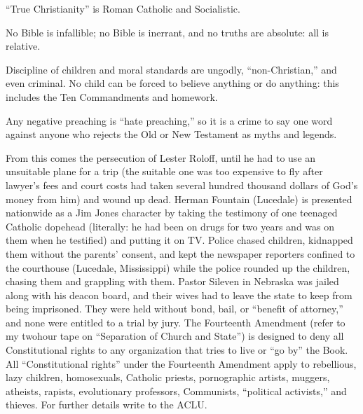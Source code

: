 {\begin{compactenum}
\item “True Christianity” is Roman Catholic and Socialistic.
\item No Bible is infallible; no Bible is inerrant, and no truths are absolute: all is relative.
\item Discipline of children and moral standards are ungodly, “non-Christian,” and even criminal. No child can be forced to believe anything or do anything: this includes the Ten Commandments and homework.
\item Any negative preaching is “hate preaching,” so it is a crime to say one word against anyone who rejects the Old or New Testament as myths and legends.
\end{compactenum}
From this comes the persecution of Lester Roloff, until he had to use an unsuitable plane for a trip (the suitable one was too expensive to fly after lawyer’s fees and court costs had taken several hundred thousand dollars of God’s money from him) and wound up dead. Herman Fountain (Lucedale) is presented nationwide as a Jim Jones character by taking the testimony of one teenaged Catholic dopehead (literally: he had been on drugs for two years and was on them when he testified) and putting it on TV. Police chased children, kidnapped them without the parents’ consent, and kept the newspaper reporters confined to the courthouse (Lucedale, Mississippi) while the police rounded up the children, chasing them and grappling with them. Pastor Sileven in Nebraska was jailed along with his deacon board, and their wives had to leave the state to keep from being imprisoned. They were held without bond, bail, or “benefit of attorney,” and none were entitled to a trial by jury. The Fourteenth Amendment (refer to my twohour tape on “Separation of Church and State”) is designed to deny all Constitutional rights to any organization that tries to live or “go by” the Book. All “Constitutional rights” under the Fourteenth Amendment apply to rebellious, lazy children, homosexuals, Catholic priests, pornographic artists, muggers, atheists, rapists, evolutionary professors, Communists, “political activists,” and thieves. For further details write to the ACLU. \cite{Ruckman1992Psalms}  }
